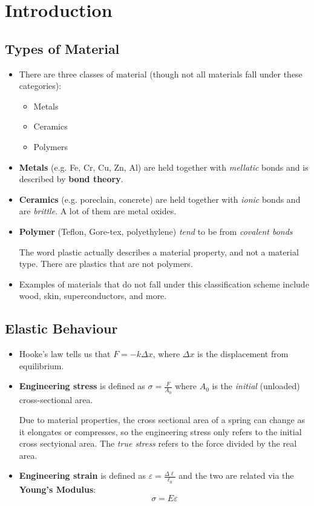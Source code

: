 \section{Introduction}
\subsection{Types of Material}
\begin{itemize}
    \item There are three classes of material (though not all materials fall under these categories):
    \begin{itemize}
        \item Metals
        \item Ceramics 
        \item Polymers
    \end{itemize}
    \item \textbf{Metals} (e.g. Fe, Cr, Cu, Zn, Al) are held together with \emph{mellatic} bonds and is described by \textbf{bond theory}.
    \item \textbf{Ceramics} (e.g. poreclain, concrete) are held together with \emph{ionic} bonds and are \emph{brittle}. A lot of them are metal oxides.
    \item \textbf{Polymer} (Teflon\textregistered, Gore-tex\textregistered, polyethylene) \emph{tend} to be from \emph{covalent bonds}
    \begin{warning}
        The word plastic actually describes a material property, and not a material type. There are plastics that are not polymers.
    \end{warning}
    \item Examples of materials that do not fall under this classification scheme include wood, skin, superconductors, and more.
\end{itemize}
\subsection{Elastic Behaviour}
\begin{itemize}
    \item Hooke's law tells us that $F=-k\Delta x$, where $\Delta x$ is the displacement from equilibrium.
    \item \textbf{Engineering stress} is defined as $\sigma = \frac{F}{A_0}$ where $A_0$ is the \textit{initial} (unloaded) cross-sectional area.
    \begin{warning}
        Due to material properties, the cross sectional area of a spring can change as it elongates or compresses, so the engineering stress only refers to the initial cross sectyional area. The \textit{true stress} refers to the force divided by the real area.
    \end{warning}
    \item \textbf{Engineering strain} is defined as $\varepsilon = \frac{\Delta \ell}{\ell_0}$ and the two are related via the \textbf{Young's Modulus}:
    \begin{equation}
        \sigma = E\varepsilon
    \end{equation}
\end{itemize}